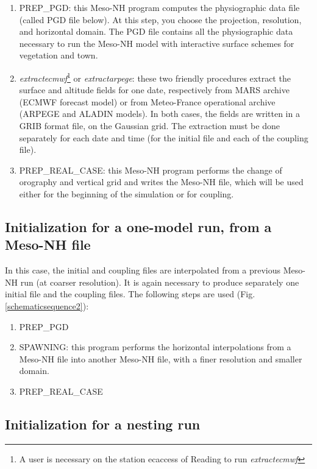 \begin{enumerate}
\item
{PREP\_PGD}: this Meso-NH program computes the physiographic data file
(called PGD file below). At this step, you choose the projection, resolution,
and horizontal domain. The PGD file contains all the physiographic data
necessary to run the Meso-NH model with interactive surface schemes for
vegetation and town.
\item
{\sl extractecmwf}\footnote{A user is necessary on the station ecaccess of Reading to run
{\sl extractecmwf}} or {\sl extractarpege}: these two friendly procedures extract
the surface and altitude fields for one date, respectively from MARS archive
(ECMWF forecast model) or from
Meteo-France operational archive (ARPEGE and ALADIN models).
In both cases, the fields are written in a GRIB format file, on the Gaussian
grid. The extraction must be done separately for each date and time (for
the initial file and each of the coupling file).
\item
{PREP\_REAL\_CASE}: this Meso-NH program performs the change of
orography and vertical grid and writes the Meso-NH file, which will be used
either for the beginning of the simulation or for coupling.
\end{enumerate}

\subsection{Initialization for a one-model run, from a Meso-NH file}

In this case, the initial and coupling files are interpolated from a
previous Meso-NH run (at coarser resolution). It is again necessary to
produce separately one initial file and the coupling files.
The following steps are used (Fig. \ref{schematicsequence2}):
\begin{enumerate}
\item
{PREP\_PGD}
\item
{SPAWNING}: this program performs the horizontal interpolations from a
Meso-NH file into another Meso-NH file, with a finer resolution and smaller
domain.
\item
{PREP\_REAL\_CASE}
\end{enumerate}

\subsection{Initialization for a nesting run}

